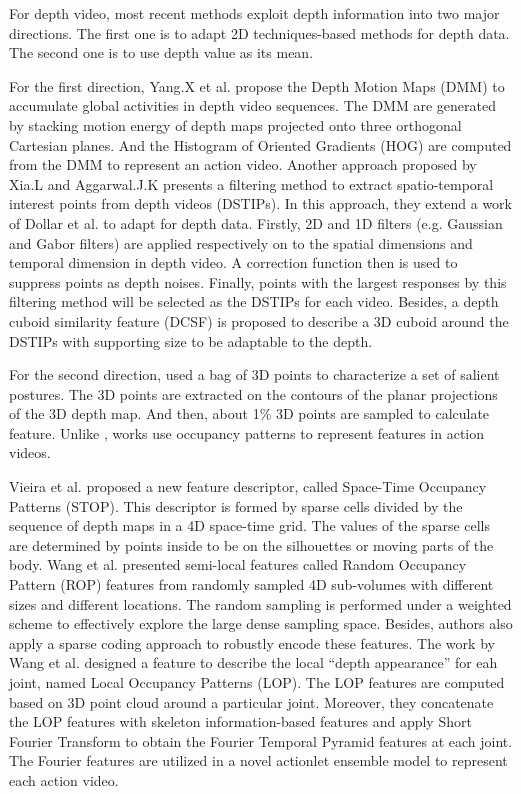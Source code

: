 \documentclass[final,3p,times,twocolumn]{elsarticle}
\begin{document}
For depth video, most recent methods exploit depth information into two major directions. The first one is to adapt 2D techniques-based methods for depth data. The second one is to use depth value as its mean.

For the first direction, Yang.X et al. \cite{yang2012recognizing} propose the Depth Motion Maps (DMM) to accumulate global activities in depth video sequences. The DMM are generated by stacking motion energy of depth maps projected onto three orthogonal Cartesian planes. And the Histogram of Oriented Gradients (HOG) \cite{dalal2005histograms} are computed from the DMM to represent an action video. Another approach proposed by Xia.L and Aggarwal.J.K \cite{xia2013spatio} presents a filtering method to extract spatio-temporal interest points from depth videos (DSTIPs). In this approach, they extend a work of Dollar et al. \cite{dollar2005behavior} to adapt for depth data. Firstly, 2D and 1D filters (e.g. Gaussian and Gabor filters) are applied respectively on to the spatial dimensions and temporal dimension in depth video. A correction function then is used to suppress points as depth noises. Finally, points with the largest responses by this filtering method will be selected as the DSTIPs for each video. Besides, a depth cuboid similarity feature (DCSF) is proposed to describe a 3D cuboid around the DSTIPs with supporting size to be adaptable to the depth.

For the second direction, \cite{li2010action} used a bag of 3D points to characterize a set of salient postures. The 3D points are extracted on the contours of the planar projections of the 3D depth map. And then, about 1\% 3D points are sampled to calculate feature. Unlike \cite{li2010action}, works \cite{vieira2012stop, wang2012robust, wang2012mining} use occupancy patterns to represent features in action videos.

Vieira et al. \cite{vieira2012stop} proposed a new feature descriptor, called Space-Time Occupancy Patterns (STOP). This descriptor is formed by sparse cells divided by the sequence of depth maps in a 4D space-time grid. The values of the sparse cells are determined by points inside to be on the silhouettes or moving parts of the body. Wang et al. \cite{wang2012robust} presented semi-local features called Random Occupancy Pattern (ROP) features from randomly sampled 4D sub-volumes with different sizes and different locations. The random sampling is performed under a weighted scheme to effectively explore the large dense sampling space. Besides, authors also apply a sparse coding approach to robustly encode these features. The work by Wang et al. \cite{wang2012mining} designed a feature to describe the local ``depth appearance'' for eah joint, named Local Occupancy Patterns (LOP). The LOP features are computed based on 3D point cloud around a particular joint. Moreover, they concatenate the LOP features with skeleton information-based features and apply Short Fourier Transform to obtain the Fourier Temporal Pyramid features at each joint. The Fourier features are utilized in a novel actionlet ensemble model to represent each action video.
\end{document}
